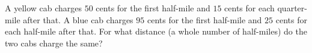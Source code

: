 A yellow cab charges $50$ cents for the first half-mile and $15$ cents for each quarter-mile after that. A blue cab charges $95$ cents for the first half-mile and $25$ cents for each half-mile after that. For what distance (a whole number of half-miles) do the two cabs charge the same?
